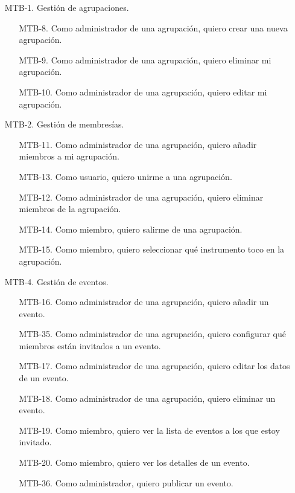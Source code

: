 \begin{enumerate}
    \item[MTB-1.] Gestión de agrupaciones.
        \begin{enumerate}
            \item[MTB-8.] Como administrador de una agrupación, quiero crear una nueva agrupación.
            \item[MTB-9.] Como administrador de una agrupación, quiero eliminar mi agrupación.
            \item[MTB-10.] Como administrador de una agrupación, quiero editar mi agrupación.
        \end{enumerate}
    \item[MTB-2.] Gestión de membresías.
        \begin{enumerate}
            \item[MTB-11.] Como administrador de una agrupación, quiero añadir miembros a mi agrupación.
            \item[MTB-13.] Como usuario, quiero unirme a una agrupación.
            \item[MTB-12.] Como administrador de una agrupación, quiero eliminar miembros de la agrupación.
            \item[MTB-14.] Como miembro, quiero salirme de una agrupación.
            \item[MTB-15.] Como miembro, quiero seleccionar qué instrumento toco en la agrupación.
        \end{enumerate}
    \item[MTB-4.] Gestión de eventos.
        \begin{enumerate}
            \item[MTB-16.] Como administrador de una agrupación, quiero añadir un evento.
            \item[MTB-35.] Como administrador de una agrupación, quiero configurar qué miembros están invitados a un evento.
            \item[MTB-17.] Como administrador de una agrupación, quiero editar los datos de un evento.
            \item[MTB-18.] Como administrador de una agrupación, quiero eliminar un evento.
            \item[MTB-19.] Como miembro, quiero ver la lista de eventos a los que estoy invitado.
            \item[MTB-20.] Como miembro, quiero ver los detalles de un evento.
            \item[MTB-36.] Como administrador, quiero publicar un evento.

\end{enumerate}
\end{enumerate}
